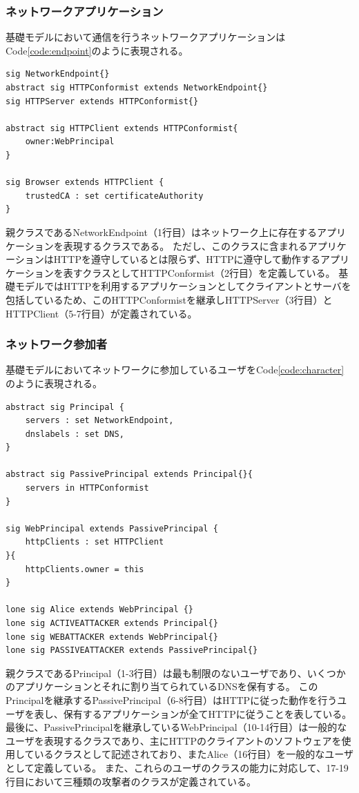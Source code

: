 \documentclass[12pt,a4paper]{jbook}
\begin{document}
\subsubsection{ネットワークアプリケーション}
基礎モデルにおいて通信を行うネットワークアプリケーションはCode\ref{code:endpoint}のように表現される。
\begin{lstlisting}[caption=ネットワーク参加者, label=code:endpoint]
sig NetworkEndpoint{}
abstract sig HTTPConformist extends NetworkEndpoint{}
sig HTTPServer extends HTTPConformist{}

abstract sig HTTPClient extends HTTPConformist{
	owner:WebPrincipal
}

sig Browser extends HTTPClient {
	trustedCA : set certificateAuthority
}
\end{lstlisting}
親クラスであるNetworkEndpoint（1行目）はネットワーク上に存在するアプリケーションを表現するクラスである。
ただし、このクラスに含まれるアプリケーションはHTTPを遵守しているとは限らず、HTTPに遵守して動作するアプリケーションを表すクラスとしてHTTPConformist（2行目）を定義している。
基礎モデルではHTTPを利用するアプリケーションとしてクライアントとサーバを包括しているため、このHTTPConformistを継承しHTTPServer（3行目）とHTTPClient（5-7行目）が定義されている。

\subsubsection{ネットワーク参加者}
基礎モデルにおいてネットワークに参加しているユーザをCode\ref{code:character}のように表現される。
\begin{lstlisting}[caption=ネットワーク参加者, label=code:character]
abstract sig Principal {
	servers : set NetworkEndpoint,
	dnslabels : set DNS,
}

abstract sig PassivePrincipal extends Principal{}{
	servers in HTTPConformist
}

sig WebPrincipal extends PassivePrincipal {
	httpClients : set HTTPClient
}{
	httpClients.owner = this
}

lone sig Alice extends WebPrincipal {}
lone sig ACTIVEATTACKER extends Principal{}
lone sig WEBATTACKER extends WebPrincipal{}
lone sig PASSIVEATTACKER extends PassivePrincipal{}
\end{lstlisting}
親クラスであるPrincipal（1-3行目）は最も制限のないユーザであり、いくつかのアプリケーションとそれに割り当てられているDNSを保有する。
このPrincipalを継承するPassivePrincipal（6-8行目）はHTTPに従った動作を行うユーザを表し、保有するアプリケーションが全てHTTPに従うことを表している。
最後に、PassivePrincipalを継承しているWebPrincipal（10-14行目）は一般的なユーザを表現するクラスであり、主にHTTPのクライアントのソフトウェアを使用しているクラスとして記述されており、またAlice（16行目）を一般的なユーザとして定義している。
また、これらのユーザのクラスの能力に対応して、17-19行目において三種類の攻撃者のクラスが定義されている。
\end{document}
